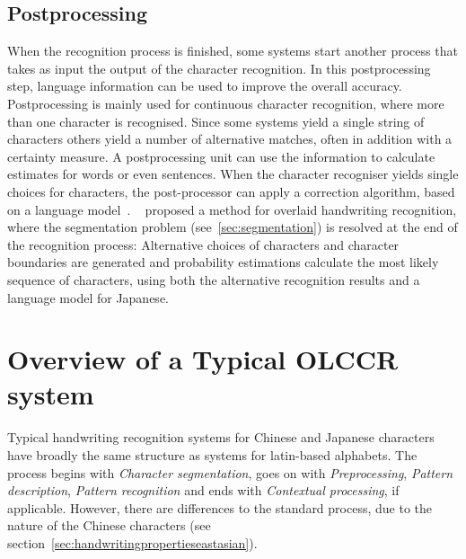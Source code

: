 \subsection{Postprocessing}
\label{sec:postprocessing}

When the recognition process is finished, some systems start another process
that takes as input the output of the character recognition. In this 
postprocessing step, language information can be used to improve the overall
accuracy. Postprocessing is mainly used for continuous character recognition,
where more than one character is recognised. Since some systems yield a 
single string of characters others yield a number of alternative matches,
often in addition with a certainty measure.
A postprocessing unit can use the information to calculate estimates for words
or even sentences. When the character recogniser yields single choices for 
characters, the post-processor can apply a correction algorithm, based on a 
language model~.
~\citeyear{Shimodaira2003} proposed a method for overlaid handwriting 
recognition, where the segmentation problem (see~\ref{sec:segmentation}) is 
resolved at the end of the recognition process: Alternative choices of characters
and character boundaries are generated and probability estimations calculate
the most likely sequence of characters, using both the alternative recognition
results and a language model for Japanese.

\section{Overview of a Typical OLCCR system}
\label{sec:olccr:overview}


Typical handwriting recognition systems for Chinese and Japanese characters 
have broadly the same structure as systems for latin-based alphabets. The 
process begins with \emph{Character segmentation}, goes on with 
\emph{Preprocessing}, \emph{Pattern description}, \emph{Pattern recognition} and 
ends with \emph{Contextual processing}, if applicable. 
However, there are differences to the standard process, due to the nature of 
the Chinese characters (see section~\ref{sec:handwritingpropertieseastasian}).

